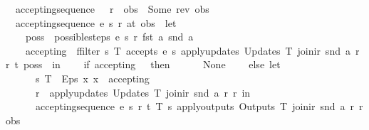 \begin{isabellebody}
\ \ {\isachardoublequoteopen}accepting{\isacharunderscore}sequence\ {\isacharunderscore}\ {\isacharunderscore}\ r\ {\isacharbrackleft}{\isacharbrackright}\ obs\ {\isacharequal}\ Some\ {\isacharparenleft}rev\ obs{\isacharparenright}{\isachardoublequoteclose}\ {\isacharbar}\isanewline
\ \ {\isachardoublequoteopen}accepting{\isacharunderscore}sequence\ e\ s\ r\ {\isacharparenleft}a{\isacharhash}t{\isacharparenright}\ obs\ {\isacharequal}\ {\isacharparenleft}let\isanewline
\ \ \ \ poss\ {\isacharequal}\ possible{\isacharunderscore}steps\ e\ s\ r\ {\isacharparenleft}fst\ a{\isacharparenright}\ {\isacharparenleft}snd\ a{\isacharparenright}{\isacharsemicolon}\isanewline
\ \ \ \ accepting\ {\isacharequal}\ ffilter\ {\isacharparenleft}{\isasymlambda}{\isacharparenleft}s{\isacharprime}{\isacharcomma}\ T{\isacharparenright}{\isachardot}\ accepts\ e\ s{\isacharprime}\ {\isacharparenleft}apply{\isacharunderscore}updates\ {\isacharparenleft}Updates\ T{\isacharparenright}\ {\isacharparenleft}join{\isacharunderscore}ir\ {\isacharparenleft}snd\ a{\isacharparenright}\ r{\isacharparenright}\ r{\isacharparenright}\ t{\isacharparenright}\ poss\ \ in\isanewline
\ \ \ \ if\ accepting\ {\isacharequal}\ {\isacharbraceleft}{\isacharbar}{\isacharbar}{\isacharbraceright}\ then\isanewline
\ \ \ \ \ \ None\isanewline
\ \ \ \ else\ let\isanewline
\ \ \ \ \ \ {\isacharparenleft}s{\isacharprime}{\isacharcomma}\ T{\isacharparenright}\ {\isacharequal}\ Eps\ {\isacharparenleft}{\isasymlambda}x{\isachardot}\ x\ {\isacharbar}{\isasymin}{\isacharbar}\ accepting{\isacharparenright}{\isacharsemicolon}\isanewline
\ \ \ \ \ \ r{\isacharprime}\ {\isacharequal}\ {\isacharparenleft}apply{\isacharunderscore}updates\ {\isacharparenleft}Updates\ T{\isacharparenright}\ {\isacharparenleft}join{\isacharunderscore}ir\ {\isacharparenleft}snd\ a{\isacharparenright}\ r{\isacharparenright}\ r{\isacharparenright}\ in\isanewline
\ \ \ \ \ \ accepting{\isacharunderscore}sequence\ e\ s{\isacharprime}\ r{\isacharprime}\ t\ {\isacharparenleft}{\isacharparenleft}T{\isacharcomma}\ s{\isacharprime}{\isacharcomma}\ {\isacharparenleft}apply{\isacharunderscore}outputs\ {\isacharparenleft}Outputs\ T{\isacharparenright}\ {\isacharparenleft}join{\isacharunderscore}ir\ {\isacharparenleft}snd\ a{\isacharparenright}\ r{\isacharparenright}{\isacharparenright}{\isacharcomma}\ r{\isacharprime}{\isacharparenright}{\isacharhash}obs{\isacharparenright}\isanewline
\ \ {\isacharparenright}{\isachardoublequoteclose}\isanewline
%
\isadelimtheory
\isanewline
%
\endisadelimtheory
%
\isatagtheory
{}\isamarkupfalse%
%
\endisatagtheory
{\isafoldtheory}%
%
\isadelimtheory
%
\endisadelimtheory
%
\end{isabellebody}%
